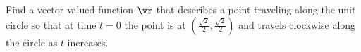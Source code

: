 \begin{activity} \label{A:9.6.2} Find a vector-valued function $\vr$ that describes a point traveling along the unit circle so that at time $t=0$ the point is at $\left(\frac{\sqrt{2}}{2}, \frac{\sqrt{2}}{2} \right)$ and travels clockwise along the circle as $t$ increases.

\end{activity}
\begin{smallhint}

\end{smallhint}
\begin{bighint}

\end{bighint}
\begin{activitySolution}

\end{activitySolution}
\aftera
